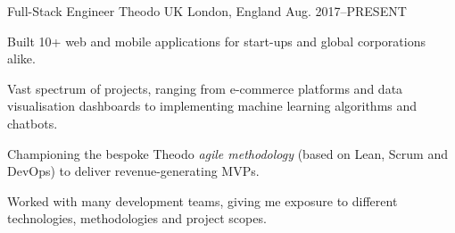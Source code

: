 

\begin{cventries}

  \cventry
    {Full-Stack Engineer} %
    {Theodo UK} %
    {London, England} %
    {Aug. 2017--\textsc{PRESENT}} %
    {
      \begin{cvitems} %
        \item Built 10+ web and mobile applications for start-ups and global corporations alike.
        \item Vast spectrum of projects, ranging from e-commerce platforms and data visualisation dashboards to implementing machine learning algorithms and chatbots.
        \item Championing the bespoke Theodo \textit{agile methodology} (based on Lean, Scrum and DevOps) to deliver revenue-generating MVPs.
        \item Worked with many development teams, giving me exposure to different technologies, methodologies and project scopes.
      \end{cvitems}
    }
    {}


\end{cventries}
